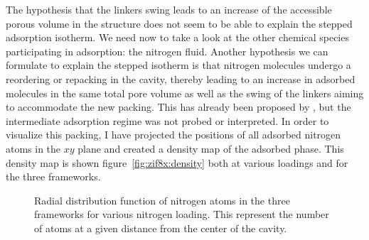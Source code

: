 \documentclass[thesis]{subfiles}
\begin{document}
The hypothesis that the linkers swing leads to an increase of the accessible
porous volume in the structure does not seem to be able to explain the stepped
adsorption isotherm. We need now to take a look at the other chemical species
participating in adsorption: the nitrogen fluid. Another hypothesis we can
formulate to explain the stepped isotherm is that nitrogen molecules undergo a
reordering or repacking in the cavity, thereby leading to an increase in
adsorbed molecules in the same total pore volume as well as the swing of the
linkers aiming to accommodate the new packing. This has already been proposed by
\citeauthor{Ania2012}\cite{Ania2012}, but the intermediate adsorption regime was
not probed or interpreted. In order to visualize this packing, I have projected
the positions of all adsorbed nitrogen atoms in the $xy$ plane and created a
density map of the adsorbed phase. This density map is shown
figure~\ref{fig:zif8x:density} both at various loadings and for the three
frameworks.

\begin{figure}[t]
    \centering
    
    \caption{Radial distribution function of nitrogen atoms in the three
    frameworks for various nitrogen loading. This represent the number of atoms
    at a given distance from the center of the cavity.}
    \label{fig:zif8x:rdf}
\end{figure}
\end{document}
